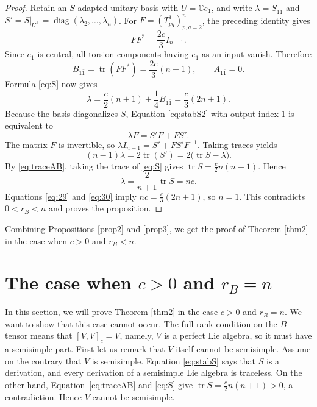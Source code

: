 \documentclass{amsart}
\newcommand{\C}{{\mathbb C}}
\begin{document}
\begin{proof}
Retain an $S$-adapted unitary basis with $U=\C e_1$, and write
$\lambda=S_{1\bar1}$ and
$S'=S|_{U^\perp}=\operatorname{diag}(\lambda_2,\ldots,\lambda_n)$.
For $F=(T^1_{pq})_{p,q=2}^n$, the preceding identity gives
\[
 FF^*=\frac{2c}{3}I_{n-1}.
\]
Since $e_1$ is central, all torsion components having $e_1$ as an
input vanish. Therefore
\[
 B_{1\bar1}=\operatorname{tr}(FF^*)=\frac{2c}{3}(n-1),
 \qquad A_{1\bar1}=0.
\]
Formula \eqref{eq:S} now gives
\begin{equation}\label{eq:29}
 \lambda=\frac{c}{2}(n+1)+\frac{1}{4}B_{1\bar1}
 =\frac{c}{3}(2n+1).
\end{equation}
Because the basis diagonalizes $S$, Equation \eqref{eq:stabS2} with
output index $1$ is equivalent to
\[
 \lambda F=S'F+FS'.
\]
The matrix $F$ is invertible, so
$\lambda I_{n-1}=S'+FS'F^{-1}$. Taking traces yields
\[
 (n-1)\lambda=2\operatorname{tr}(S')
 =2\bigl(\operatorname{tr}S-\lambda\bigr).
\]
By \eqref{eq:traceAB}, taking the trace of \eqref{eq:S} gives
$\operatorname{tr}S=\frac{c}{2}n(n+1)$.
Hence
\begin{equation}\label{eq:30}
 \lambda=\frac{2}{n+1}\operatorname{tr}S=nc.
\end{equation}
Equations \eqref{eq:29} and \eqref{eq:30} imply
$nc=\frac{c}{3}(2n+1)$, so $n=1$. This contradicts $0<r_B<n$ and
proves the proposition.
\end{proof}


Combining Propositions \ref{prop2} and \ref{prop3}, we get the proof of Theorem \ref{thm2} in the case when $c>0$ and $r_B<n$.



\vspace{0.3cm}

\section{The case when $c>0$ and $r_B=n$}

In this section, we will prove Theorem \ref{thm2} in the case $c>0$ and $r_B=n$. We want to show that this case cannot occur. The full rank condition on the $B$ tensor means that $[V,V]_c=V$, namely, $V$ is a perfect Lie algebra, so it must have a semisimple part. First let us remark that $V$ itself cannot be semisimple. Assume on the contrary that $V$ is semisimple{. Equation \eqref{eq:stabS} says that } $S$  {is a derivation, and every derivation of a semisimple Lie algebra } is traceless. On the other hand,   {Equation~\eqref{eq:traceAB} and \eqref{eq:S} give $\operatorname{tr}S=\frac{c}{2}n(n+1)>0$, a contradiction. Hence } $V$ cannot be semisimple.
\end{document}
